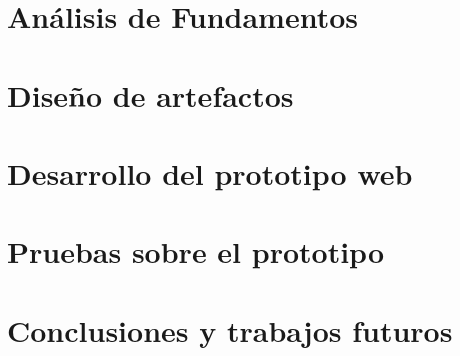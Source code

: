 \documentclass[letterpaper, 11pt, oneside]{report}
\begin{document}
\chapter{Análisis de Fundamentos}



\chapter{Diseño de artefactos}



\chapter{Desarrollo del prototipo web}



\chapter{Pruebas sobre el prototipo}



\chapter{Conclusiones y trabajos futuros}



\nocite{*}


\newpage
{}
\label{Anexos}

\end{document}
